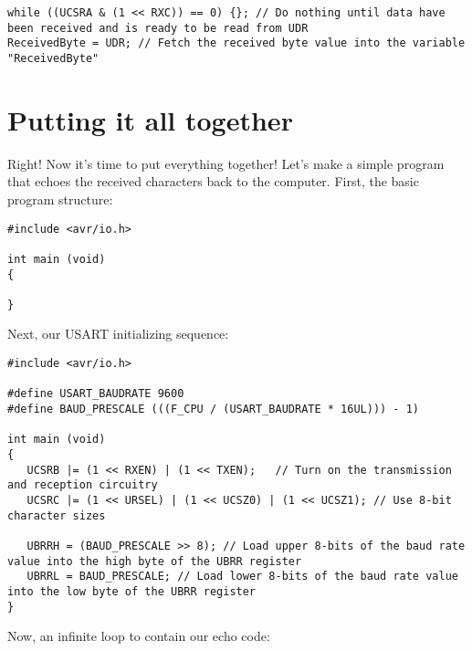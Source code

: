 \documentclass[a4paper,oneside,notitlepage]{book}
\begin{document}
\begin{center}
\begin{lstlisting}
while ((UCSRA & (1 << RXC)) == 0) {}; // Do nothing until data have been received and is ready to be read from UDR
ReceivedByte = UDR; // Fetch the received byte value into the variable "ReceivedByte"
\end{lstlisting}
\end{center}

\chapter{Putting it all together}

Right! Now it's time to put everything together! Let's make a simple program that echoes the received characters back to the computer. First, the basic program structure:

\begin{center}
\begin{lstlisting}
#include <avr/io.h>

int main (void)
{

}
\end{lstlisting}
\end{center}

Next, our USART initializing sequence:

\begin{center}
\begin{lstlisting}
#include <avr/io.h>

#define USART_BAUDRATE 9600
#define BAUD_PRESCALE (((F_CPU / (USART_BAUDRATE * 16UL))) - 1)

int main (void)
{
   UCSRB |= (1 << RXEN) | (1 << TXEN);   // Turn on the transmission and reception circuitry
   UCSRC |= (1 << URSEL) | (1 << UCSZ0) | (1 << UCSZ1); // Use 8-bit character sizes

   UBRRH = (BAUD_PRESCALE >> 8); // Load upper 8-bits of the baud rate value into the high byte of the UBRR register
   UBRRL = BAUD_PRESCALE; // Load lower 8-bits of the baud rate value into the low byte of the UBRR register
}
\end{lstlisting}
\end{center}

Now, an infinite loop to contain our echo code:
\end{document}

